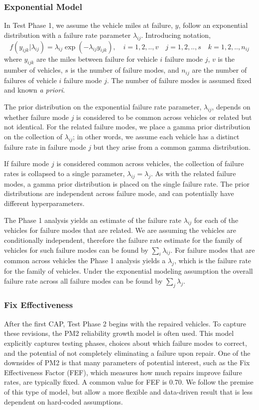 \documentclass[12pt]{article}
\begin{document}
\subsubsection{Exponential Model}
In Test Phase 1, we assume the vehicle miles at failure, $y$, follow an
exponential distribution with a failure rate parameter $\lambda_{ij}$.
Introducing notation,
\begin{equation}
f(y_{ijk}|\lambda_{ij})=\lambda_{ij} \exp(-\lambda_{ij}
y_{ijk}), \quad i = 1,2,..,v \quad j=1,2,..,s \quad k=1,2,..,n_{ij}
\end{equation}
where $y_{ijk}$ are the miles between failure for vehicle $i$ failure mode $j$,
$v$ is the number of vehicles, $s$ is the number of failure modes, and $n_{ij}$
are the number of failures of vehicle $i$ failure mode $j$. The number of
failure modes is assumed fixed and known \textit{a priori}.

The prior distribution on the exponential failure rate parameter,
$\lambda_{ij}$, depends on whether failure mode $j$ is considered to be common
across vehicles or related but not identical. For the related failure modes,
we place a gamma prior distribution on the collection of $\lambda_{ij}$; in
other words, we assume each vehicle has a distinct failure rate in failure mode
$j$ but they arise from a common gamma distribution.

If failure mode $j$ is considered common across vehicles, the collection of
failure rates is collapsed to a single parameter, $\lambda_{ij} = \lambda_j$. As
with the related failure modes, a gamma prior distribution is placed on the
single failure rate. The prior distributions are independent across failure
mode, and can potentially have different hyperparameters.

The Phase 1 analysis yields an estimate of the failure rate $\lambda_{ij}$ for
each of the vehicles for failure modes that are related. We are assuming the
vehicles are conditionally independent, therefore the failure rate estimate for
the family of vehicles for such failure modes can be found by
$\sum_{i}\lambda_{ij}$. For failure modes that are common across vehicles the
Phase 1 analysis yields a $\lambda_{j}$, which is the failure rate for the
family of vehicles. Under the exponential modeling assumption the overall
failure rate across all failure modes can be found by $\sum_{j}\lambda_{j}$.

\subsubsection{Fix Effectiveness}
After the first CAP, Test Phase 2 begins with the repaired vehicles. To capture
these revisions, the PM2 reliability growth model \cite{EH06} is often used.
This model explicitly captures testing phases, choices about which failure modes
to correct, and the potential of not completely eliminating a failure upon
repair. One of the downsides of PM2 is that many parameters of potential
interest, such as the Fix Effectiveness Factor (FEF), which measures how much
repairs improve failure rates, are typically fixed. A common value for FEF is
0.70. We follow the premise of this type of model, but allow a more flexible and
data-driven result that is less dependent on hard-coded assumptions.
\end{document}
